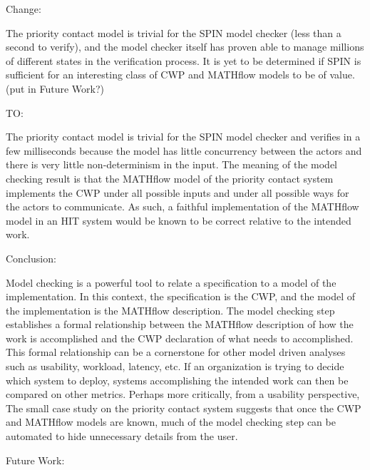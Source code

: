 Change:

The priority contact model is trivial for the SPIN model checker (less than a second to verify), and the model checker itself has proven able to manage millions of different states in the verification process. It is yet to be determined if SPIN is sufficient for an interesting class of CWP and MATHflow models to be of value. (put in Future Work?)

TO:

The priority contact model is trivial for the SPIN model checker and verifies in a few milliseconds because the model has little concurrency between the actors and there is very little non-determinism in the input. The meaning of the model checking result is that the MATHflow model of the priority contact system implements the CWP under all possible inputs and under all possible ways for the actors to communicate. As such, a faithful implementation of the MATHflow model in an HIT system would be known to be correct relative to the intended work.

Conclusion:

Model checking is a powerful tool to relate a specification to a model
of the implementation. In this context, the specification is the CWP,
and the model of the implementation is the MATHflow description. The
model checking step establishes a formal relationship between the
MATHflow description of how the work is accomplished and the CWP
declaration of what needs to accomplished. This formal relationship
can be a cornerstone for other model driven analyses such as
usability, workload, latency, etc. If an organization is trying to
decide which system to deploy, systems accomplishing the intended work
can then be compared on other metrics. Perhaps more critically, from a
usability perspective, The small case study on the priority contact
system suggests that once the CWP and MATHflow models are known, much
of the model checking step can be automated to hide unnecessary
details from the user.

Future Work:

